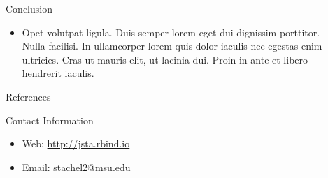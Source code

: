 \documentclass[final,hyperref={pdfpagelabels=false}]{beamer}
\begin{document}
\begin{frame}[t]
\begin{columns}[t]
\begin{column}{.465\textwidth}
\begin{block}{Conclusion}
\begin{itemize}
\item Opet \alert{volutpat} ligula. Duis semper lorem eget dui dignissim porttitor. Nulla facilisi. In ullamcorper lorem quis dolor iaculis nec egestas enim ultricies. Cras ut mauris elit, ut lacinia dui. Proin in ante et libero hendrerit iaculis.
\end{itemize}

\end{block}


\begin{block}{References}
        
\nocite{*} %
\small{
}

\end{block}



\begin{block}{Contact Information}

\begin{itemize}
\item Web: \href{http://jsta.rbind.io}{http://jsta.rbind.io}
\item Email: \href{mailto:stachel2@msu.edu}{stachel2@msu.edu}
\end{itemize}

\end{block}


\end{column} %

\begin{column}{.015\textwidth}\end{column} %

\end{columns} %

\end{frame} %
\end{document}
